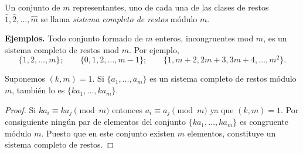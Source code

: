 \documentclass[12pt,a4paper]{book}
\begin{document}
    \begin{definicion}
        Un conjunto de $m$ representantes, uno de cada una de las clases de restos
        $\hat{1},\hat{2},\dots,\hat{m}$ se llama \textit{sistema completo de restos}
        módulo $m$.
    \end{definicion}

    \textbf{Ejemplos.} Todo conjunto formado de $m$ enteros, incongruentes mod $m$, es un
    sistema completo de restos mod $m$. Por ejemplo,
    \begin{equation*}
        \{1,2,\dots,m\};\qquad\{0,1,2,\dots,m-1\};\qquad
        \{1,m+2,2m+3,3m+4,\dots,m^{2}\}.
    \end{equation*}

    \begin{teorema}
        Suponemos $(k,m)=1$. Si $\{a_{1},\dots,a_{m}\}$ es un sistema completo de restos
        módulo $m$, también lo es $\{ka_{1},\dots,ka_{m}\}$.
    \end{teorema}

    \begin{proof}
        Si $ka_{i}\equiv ka_{j}\pmod{m}$ entonces $a_{i}\equiv a_{j}\pmod{m}$ ya que $(k,m)=1$.
        Por consiguiente ningún par de elementos del conjunto $\{ka_{1},\dots,ka_{m}\}$ es
        congruente módulo $m$. Puesto que en este conjunto existen $m$ elementos,
        constituye un sistema completo de restos.
    \end{proof}
\end{document}
